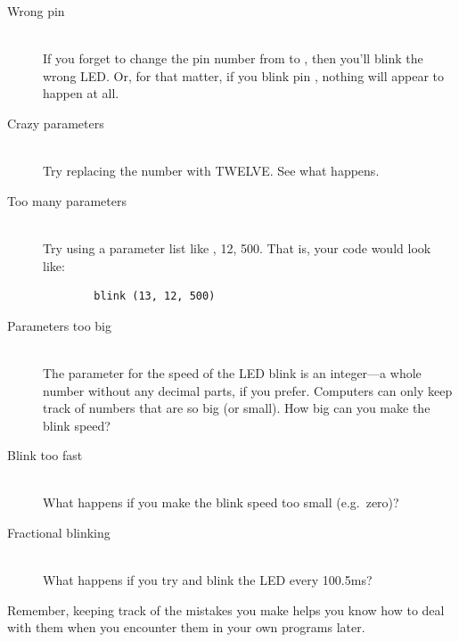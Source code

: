 \begin{description}
	\item[Wrong pin]\ \\
		If you forget to change the pin number from {} to {}, then you'll blink the wrong LED. Or, for that matter, if you blink pin {}, nothing will appear to happen at all.
	\item[Crazy parameters]\ \\
	Try replacing the number {} with {\code TWELVE}. See what happens. 
	\item[Too many parameters]\ \\
	Try using a parameter list like {, 12, 500}. That is, your code would look like:
	\begin{verbatim}
		blink (13, 12, 500)
	\end{verbatim}
	\item[Parameters too big]\ \\
	The parameter for the speed of the LED blink is an integer---a whole number without any decimal parts, if you prefer. Computers can only keep track of numbers that are so big (or small). How big can you make the blink speed? 
	\item[Blink too fast]\ \\
	What happens if you make the blink speed too small (e.g.~zero)?
	\item[Fractional blinking]\ \\
	What happens if you try and blink the LED every 100.5ms?
\end{description}

Remember, keeping track of the mistakes you make helps you know how to deal with them when you encounter them in your own programs later.


		



 


